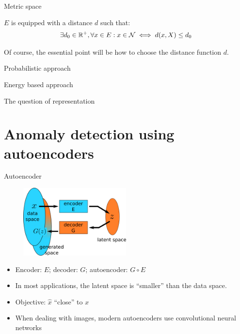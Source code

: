\documentclass[xcolor=pdftex,dvipsnames,table,mathserif]{beamer}
\begin{document}
\begin{frame}{Metric space}

  $E$ is equipped with a distance $d$ such that:
  \[
  \exists d_0 \in \mathbb{R}^+,  \forall x \in E: x \in \mathcal{N} \iff d(x, X) \leq d_0
  \]

  Of course, the essential point will be how to choose the distance function $d$.

\end{frame}


\begin{frame}{Probabilistic approach}




\end{frame}



\begin{frame}{Energy based approach}

\end{frame}


\begin{frame}{The question of representation}

\end{frame}


\section{Anomaly detection using autoencoders}


\begin{frame}{Autoencoder}

\begin{figure}[ht]
  \centering
  \includegraphics[width=0.5\textwidth]{ae.png}
\end{figure}

\begin{itemize}
\item Encoder: $E$; decoder: $G$; autoencoder: $G \circ E$
\item In most applications, the latent space is ``smaller'' than the data space.
  \item Objective: $\hat{x}$ ``close'' to $x$
  \item When dealing with images, modern autoencoders use convolutional neural networks
\end{itemize}

\end{frame}
\end{document}
